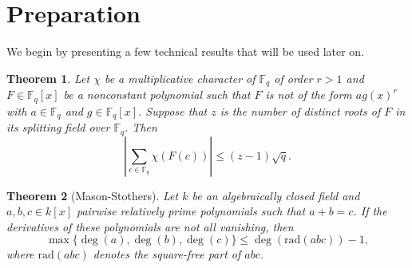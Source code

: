 \documentclass[11pt]{amsart}
\newcommand{\rad}{\mathrm{rad}}
\newcommand{\F}{\mathbb{F}}
\newtheorem{theorem}{Theorem}[section]
\theoremstyle{definition}
\theoremstyle{remark}
\begin{document}
%
%
%
%

% 
%



\section{Preparation}
We begin by presenting a few  technical results that will be used later on.

\begin{theorem}\cite[Theorem 5.41]{Nie} \label{thm:Weil} Let $\chi$ be a multiplicative character of $\F_{q}$ of order $r>1$ and  $F\in \F_{q}[x]$ be a nonconstant polynomial such that $F$ is not of the form $ag(x)^r$ with $a\in \F_q$ and $g\in \F_{q}[x]$.  Suppose that $z$ is the number of distinct roots of $F$ in its splitting field over $\F_{q}$. Then
$$\left|\sum_{c\in \F_{q}}\chi(F(c))\right|\le (z-1)\sqrt{q}.$$
\end{theorem}



\begin{theorem}[Mason-Stothers]\label{abc} Let $k$ be an algebraically closed field and $a, b, c\in k[x]$ pairwise relatively prime polynomials such that $a+b=c$. If the derivatives of these polynomials are not all vanishing, then 
$$\max\{\deg(a), \deg(b), \deg(c)\}\le \deg(\rad(abc))-1,$$
where $\rad(abc)$ denotes the square-free part of $abc$.
\end{theorem}
\end{document}
